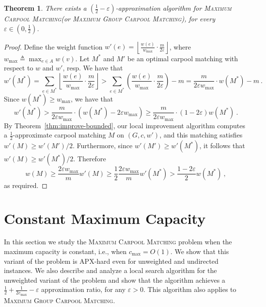 \documentclass[11pt]{article}
\newtheorem{theorem}{Theorem}
\newcommand{\floor}[1]{\left\lfloor #1 \right\rfloor}
\newcommand{\paren}[1]{\left( #1 \right)}
\newcommand{\eqdf}{\triangleq}
\newcommand{\half}{\frac{1}{2}}
\newcommand{\inv}[1]{\frac{1}{#1}}
\newcommand{\carpool}{\textsc{Maximum Carpool Matching}\xspace}
\newcommand{\gcp}{\textsc{Maximum Group Carpool Matching}\xspace}
\newcommand{\cmax}{c_{\max}}
\newcommand{\eps}{\varepsilon}
\begin{document}
\begin{theorem}
\label{thm:improve}
There exists a $(\half-\eps)$-approximation algorithm for \carpool (or
\gcp), for every $\eps \in (0,\half)$.
\end{theorem}
\begin{proof}%
Define the weight function $w'(e)
= \floor{\frac{w(e)}{w_{\max}} \cdot \frac{m}{2\eps}}$, where
$w_{\max} \eqdf \max_{e \in A} w(v)$.
%
Let $M^*$ and $M'$ be an optimal carpool matching with respect to $w$
and $w'$, resp.  We have that
\[
w'(M^*)
=    \sum_{e \in M^*} \floor{\frac{w(e)}{w_{\max}} \cdot \frac{m}{2\eps}}
>    \sum_{e \in M^*} \paren{ \frac{w(e)}{w_{\max}} \cdot \frac{m}{2\eps} } - m
=    \frac{m}{2\eps w_{\max}} \cdot w(M^*) - m
~.
\]
Since $w(M^*) \geq w_{\max}$, we have that 
\[
w'(M^*)
>    \frac{m}{2\eps w_{\max}} \cdot (w(M^*) - 2\eps w_{\max})
\geq \frac{m}{2\eps w_{\max}} \cdot (1 - 2\eps) w(M^*)
~.
\]
By Theorem~\ref{thm:improve-bounded}, our local improvement algorithm
computes a $\half$-approximate carpool matching $M$ on $(G, c, w')$,
and this matching satisfies $w'(M) \geq w'(M')/2$.  Furthermore, since
$w'(M') \geq w'(M^*)$, it follows that $w'(M) \geq w'(M^*)/2$.
Therefore
\[
w(M)
\geq \frac{2\eps w_{\max}}{m} w'(M) 
\geq \frac{1}{2} \frac{2\eps w_{\max}}{m} w'(M^*)
>    \frac{1-2\eps}{2} w(M^*)
~,
\]
as required.
\end{proof}






\section{Constant Maximum Capacity}
\label{sec:cmax}

In this section we study the \carpool problem when the maximum
capacity is constant, i.e., when $\cmax = O(1)$.  We show that this
variant of the problem is APX-hard even for unweighted and undirected
instances.  We also describe and analyze a local search algorithm for
the unweighted variant of the problem and show that the algorithm
achieves a $\half + \inv{2\cmax} - \eps$ approximation ratio, for any
$\varepsilon > 0$.
%
This algorithm also applies to \gcp.
\end{document}
